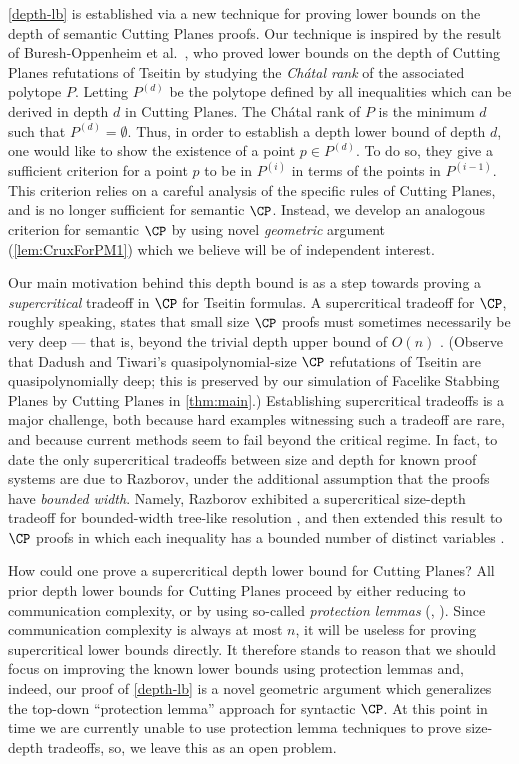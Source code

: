 \documentclass{toc}
\begin{document}
\autoref{depth-lb} is established via a new technique for proving lower bounds on the depth of semantic Cutting Planes proofs. Our technique is inspired by the result of Buresh-Oppenheim et al.~\cite{BGHMP06}, who proved lower bounds on the depth of Cutting Planes refutations of Tseitin by studying the \emph{Ch\'{a}tal rank} of the associated polytope $P$. Letting $P^{(d)}$ be the polytope %
defined by %
all inequalities which can be derived in depth $d$ in Cutting Planes. The Ch\'{a}tal rank of $P$ is the minimum $d$ such that $P^{(d)}=\emptyset$. Thus, in order to establish a depth lower bound of depth $d$, one would like to show the existence of a point $p \in P^{(d)}$. To do so, they give a sufficient criterion for a point $p$ to be in $P^{(i)}$ in terms of the points in $P^{(i-1)}$. This criterion relies on a careful analysis of the specific rules of Cutting Planes, and is no longer sufficient for semantic $\CP$. Instead, we develop an analogous criterion for semantic $\CP$ by using novel \emph{geometric} argument (\autoref{lem:CruxForPM1}) which we believe will be of independent interest. 


%
Our main motivation behind this depth bound is as a step towards proving a \emph{supercritical} tradeoff in $\CP$ for Tseitin formulas.
A supercritical tradeoff for $\CP$, roughly speaking, states that small size $\CP$ proofs must sometimes necessarily be very deep --- that is, beyond the trivial depth upper bound of $O(n)$ \cite{Razborov16,BerkholzN20}.
(Observe that Dadush and Tiwari's quasipolynomial-size $\CP$ refutations of Tseitin are quasipolynomially deep; this is preserved by our simulation of Facelike Stabbing Planes by Cutting Planes in \autoref{thm:main}.)
Establishing supercritical tradeoffs is a major challenge, both because
hard examples witnessing such a tradeoff are rare, and because current methods seem to fail beyond the critical regime.
In fact, to date the only supercritical tradeoffs between size and depth for known proof systems are due to Razborov, under the additional assumption that the proofs have \emph{bounded width}.
Namely, Razborov exhibited a supercritical size-depth tradeoff for
%
bounded-width    %
tree-like resolution \cite{Razborov16}, and then extended this result to $\CP$ proofs in which each inequality has a bounded number of distinct variables \cite{Razborov17}.

How could one prove a supercritical depth lower bound for Cutting Planes?
All prior depth lower bounds for Cutting Planes proceed by either reducing to communication complexity, or by using so-called \emph{protection lemmas} (\eg, \cite{BGHMP06}).
Since communication complexity is always at most $n$, it will be useless for proving supercritical lower bounds directly.
It therefore stands to reason that we should focus on improving the known lower bounds using protection lemmas and, indeed, our proof of \autoref{depth-lb} is a novel geometric argument which generalizes the top-down ``protection lemma'' approach \cite{BGHMP06} for syntactic $\CP$.
At this point in time we are currently unable to use protection lemma techniques to prove size-depth tradeoffs, so, we leave this as an open problem.
\end{document}
